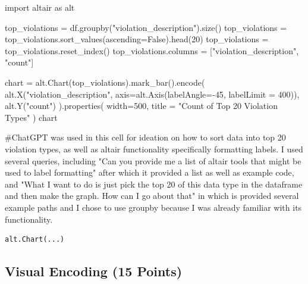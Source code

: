 \documentclass[
  letterpaper,
  DIV=11,
  numbers=noendperiod]{scrartcl}
\newenvironment{Shaded}{\begin{snugshade}}{\end{snugshade}}
\newcommand{\CommentTok}[1]{\textcolor[rgb]{0.37,0.37,0.37}{#1}}
\newcommand{\DecValTok}[1]{\textcolor[rgb]{0.68,0.00,0.00}{#1}}
\newcommand{\ImportTok}[1]{\textcolor[rgb]{0.00,0.46,0.62}{#1}}
\newcommand{\NormalTok}[1]{\textcolor[rgb]{0.00,0.23,0.31}{#1}}
\newcommand{\OperatorTok}[1]{\textcolor[rgb]{0.37,0.37,0.37}{#1}}
\newcommand{\StringTok}[1]{\textcolor[rgb]{0.13,0.47,0.30}{#1}}
\newcommand{\VariableTok}[1]{\textcolor[rgb]{0.07,0.07,0.07}{#1}}
\begin{document}
\begin{Shaded}
\begin{Highlighting}[]
\ImportTok{import}\NormalTok{ altair }\ImportTok{as}\NormalTok{ alt}

\NormalTok{top\_violations }\OperatorTok{=}\NormalTok{ df.groupby(}\StringTok{"violation\_description"}\NormalTok{).size()}
\NormalTok{top\_violations }\OperatorTok{=}\NormalTok{ top\_violations.sort\_values(ascending}\OperatorTok{=}\VariableTok{False}\NormalTok{).head(}\DecValTok{20}\NormalTok{)}
\NormalTok{top\_violations }\OperatorTok{=}\NormalTok{ top\_violations.reset\_index()}
\NormalTok{top\_violations.columns }\OperatorTok{=}\NormalTok{ [}\StringTok{"violation\_description"}\NormalTok{, }\StringTok{"count"}\NormalTok{]}

\NormalTok{chart }\OperatorTok{=}\NormalTok{ alt.Chart(top\_violations).mark\_bar().encode(}
\NormalTok{    alt.X(}\StringTok{"violation\_description"}\NormalTok{, axis}\OperatorTok{=}\NormalTok{alt.Axis(labelAngle}\OperatorTok{={-}}\DecValTok{45}\NormalTok{, labelLimit }\OperatorTok{=} \DecValTok{400}\NormalTok{)),}
\NormalTok{    alt.Y(}\StringTok{"count"}\NormalTok{)}
\NormalTok{).properties(}
\NormalTok{    width}\OperatorTok{=}\DecValTok{500}\NormalTok{,}
\NormalTok{    title }\OperatorTok{=} \StringTok{"Count of Top 20 Violation Types"}
\NormalTok{)}
\NormalTok{chart}

\CommentTok{\#ChatGPT was used in this cell for ideation on how to sort data into top 20 violation types, as well as altair functionality specifically formatting labels. I used several queries, including "Can you provide me a list of altair tools that might be used to label formatting" after which it provided a list as well as example code, and "What I want to do is just pick the top 20 of this data type in the dataframe and then make the graph. How can I go about that" in which is provided several example paths and I chose to use groupby because I was already familiar with its functionality.}
\end{Highlighting}
\end{Shaded}

\begin{verbatim}
alt.Chart(...)
\end{verbatim}

\subsection{Visual Encoding (15
Points)}\label{visual-encoding-15-points}
\end{document}
